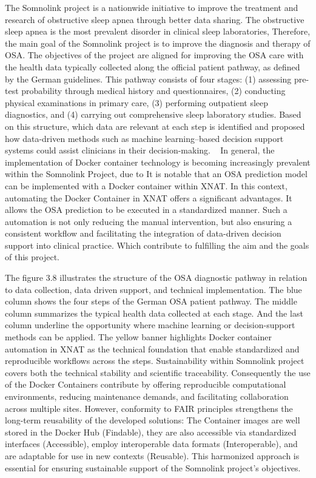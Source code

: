 The Somnolink project is a nationwide initiative to improve the treatment and research of obstructive sleep apnea through better data sharing. The obstructive sleep apnea is the most prevalent disorder in clinical sleep laboratories, Therefore, the main goal of the Somnolink project is to improve the diagnosis and therapy of OSA.
The objectives of the project are aligned for improving the OSA care with the health data typically collected along the official patient pathway, as defined by the German guidelines. This pathway consists of four stages: (1) assessing pre-test probability through medical history and questionnaires, (2) conducting physical examinations in primary care, (3) performing outpatient sleep diagnostics, and (4) carrying out comprehensive sleep laboratory studies. Based on this structure, which data are relevant at each step is identified and proposed how data-driven methods such as machine learning–based decision support systems could assist clinicians in their decision-making. ~\cite{krefting_somnolink_2025}
In general, the implementation of Docker container technology is becoming increasingly prevalent within the Somnolink Project, due to It is notable that an OSA prediction model can be implemented with a Docker container within XNAT.
In this context, automating the Docker Container in XNAT offers a significant advantages. It allows the OSA prediction to be executed in a standardized manner. Such a automation is not only reducing the manual intervention, but also ensuring a consistent  workflow and facilitating  the integration of data-driven decision support into clinical practice. Which contribute to fulfilling the aim and the goals of this project.


The figure 3.8 illustrates the structure of the OSA diagnostic pathway in relation to data collection, data driven support, and technical implementation.
The blue column shows the four steps of the German OSA patient pathway. The middle column summarizes the typical health data collected at each stage. And the last column underline the opportunity where machine learning or decision-support methods can be applied. 
The yellow banner highlights Docker container automation in XNAT  as the technical foundation that enable standardized and reproducible workflows across the steps.
Sustainability within Somnolink project covers both the technical stability and scientific traceability. Consequently the use of the Docker Containers contribute by offering reproducible computational environments, reducing maintenance demands, and facilitating collaboration across multiple sites. However, conformity to FAIR principles strengthens the long-term reusability of the developed solutions: The Container images are well stored in the Docker Hub (Findable), they are also accessible via standardized interfaces (Accessible), employ interoperable data formats (Interoperable), and are adaptable for use in new contexts (Reusable). This harmonized approach is essential for ensuring sustainable support of the Somnolink project’s objectives. 
